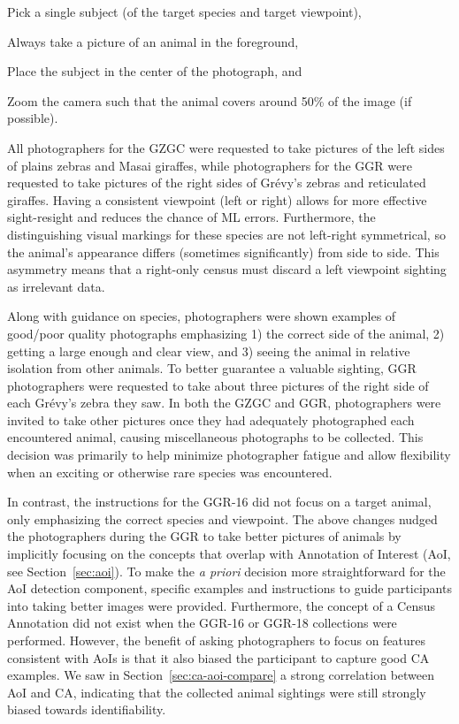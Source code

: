 \numsquishlist
\item Pick a single subject (of the target species and target viewpoint),
\item Always take a picture of an animal in the foreground,
\item Place the subject in the center of the photograph, and
\item Zoom the camera such that the animal covers around 50\% of the image (if possible).
\numsquishend

All photographers for the GZGC were requested to take pictures of the left sides of plains zebras and Masai giraffes, while photographers for the GGR were requested to take pictures of the right sides of Gr\'evy's zebras and reticulated giraffes.  Having a consistent viewpoint (left or right) allows for more effective sight-resight and reduces the chance of ML errors. Furthermore, the distinguishing visual markings for these species are not left-right symmetrical, so the animal's appearance differs (sometimes significantly) from side to side.  This asymmetry means that a right-only census must discard a left viewpoint sighting as irrelevant data.

Along with guidance on species, photographers were shown examples of good/poor quality photographs emphasizing 1) the correct side of the animal, 2) getting a large enough and clear view, and 3) seeing the animal in relative isolation from other animals.  To better guarantee a valuable sighting, GGR photographers were requested to take about three pictures of the right side of each Gr\'evy's zebra they saw.  In both the GZGC and GGR, photographers were invited to take other pictures once they had adequately photographed each encountered animal, causing miscellaneous photographs to be collected.  This decision was primarily to help minimize photographer fatigue and allow flexibility when an exciting or otherwise rare species was encountered.

In contrast, the instructions for the GGR-16 did not focus on a target animal, only emphasizing the correct species and viewpoint.  The above changes nudged the photographers during the GGR to take better pictures of animals by implicitly focusing on the concepts that overlap with Annotation of Interest (AoI, see Section~\ref{sec:aoi}).  To make the \textit{a priori} decision more straightforward for the AoI detection component, specific examples and instructions to guide participants into taking better images were provided.  Furthermore, the concept of a Census Annotation did not exist when the GGR-16 or GGR-18 collections were performed.  However, the benefit of asking photographers to focus on features consistent with AoIs is that it also biased the participant to capture good CA examples.  We saw in Section~\ref{sec:ca-aoi-compare} a strong correlation between AoI and CA, indicating that the collected animal sightings were still strongly biased towards identifiability.


